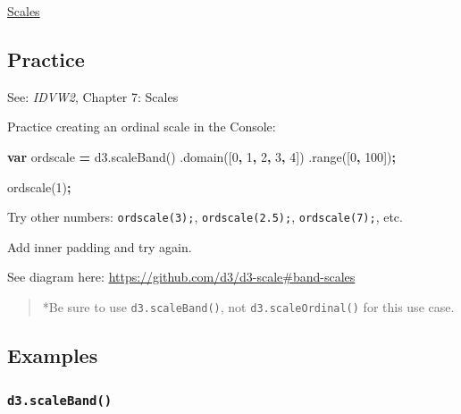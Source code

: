 \documentclass[openany]{book}
\newenvironment{Shaded}{\begin{snugshade}}{\end{snugshade}}
\newcommand{\AttributeTok}[1]{\textcolor[rgb]{0.77,0.63,0.00}{#1}}
\newcommand{\DecValTok}[1]{\textcolor[rgb]{0.00,0.00,0.81}{#1}}
\newcommand{\KeywordTok}[1]{\textcolor[rgb]{0.13,0.29,0.53}{\textbf{#1}}}
\newcommand{\NormalTok}[1]{#1}
\newcommand{\OperatorTok}[1]{\textcolor[rgb]{0.81,0.36,0.00}{\textbf{#1}}}
\newcommand{\VariableTok}[1]{\textcolor[rgb]{0.00,0.00,0.00}{#1}}
\begin{document}
\href{pdfs/scales.pdf}{Scales}

\hypertarget{practice}{%
\subsection{Practice}\label{practice}}

See: \emph{IDVW2}, Chapter 7: Scales

Practice creating an ordinal scale in the Console:

\begin{Shaded}
\begin{Highlighting}[]
\KeywordTok{var}\NormalTok{ ordscale }\OperatorTok{=} \VariableTok{d3}\NormalTok{.}\AttributeTok{scaleBand}\NormalTok{()}
\NormalTok{  .}\AttributeTok{domain}\NormalTok{([}\DecValTok{0}\OperatorTok{,} \DecValTok{1}\OperatorTok{,} \DecValTok{2}\OperatorTok{,} \DecValTok{3}\OperatorTok{,} \DecValTok{4}\NormalTok{])}
\NormalTok{  .}\AttributeTok{range}\NormalTok{([}\DecValTok{0}\OperatorTok{,} \DecValTok{100}\NormalTok{])}\OperatorTok{;}
\end{Highlighting}
\end{Shaded}

\begin{Shaded}
\begin{Highlighting}[]
\AttributeTok{ordscale}\NormalTok{(}\DecValTok{1}\NormalTok{)}\OperatorTok{;}
\end{Highlighting}
\end{Shaded}

Try other numbers: \texttt{ordscale(3);}, \texttt{ordscale(2.5);}, \texttt{ordscale(7);}, etc.

Add inner padding and try again.

See diagram here: \url{https://github.com/d3/d3-scale\#band-scales}

\begin{quote}
 *Be sure to use \texttt{d3.scaleBand()}, not \texttt{d3.scaleOrdinal()} for this use case.
\end{quote}

\hypertarget{examples}{%
\subsection{Examples}\label{examples}}

\hypertarget{d3.scaleband}{%
\subsubsection*{\texorpdfstring{\texttt{d3.scaleBand()}}{d3.scaleBand()}}\label{d3.scaleband}}
\end{document}
